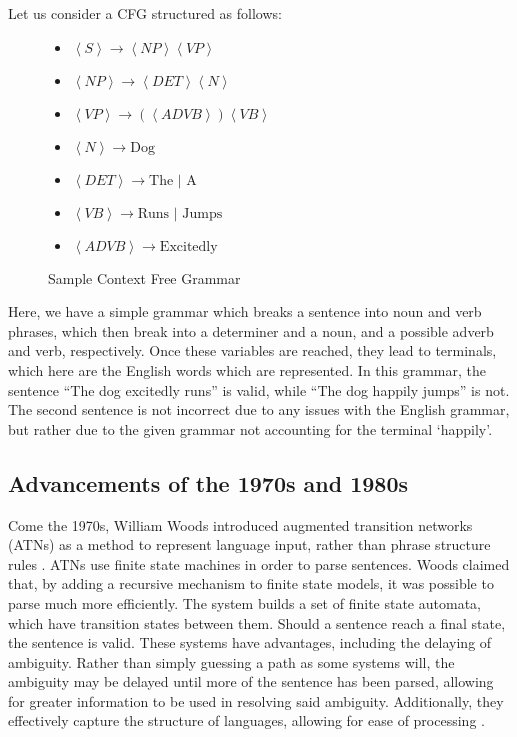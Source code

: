 Let us consider a CFG structured as follows:

\begin{center}
\begin{figure}[H]
\begin{center}

\begin{itemize}

	\item $\left<S\right> \rightarrow \left< NP \right> \left<VP\right>$
	\item $\left<NP\right> \rightarrow \left<DET\right> \left<N\right>$
	\item $\left<VP\right> \rightarrow (\left<ADVB\right>) \left<VB\right>$
	\item $\left<N\right> \rightarrow \text{Dog}$
	\item $\left<DET\right> \rightarrow \text{The | A}$
	\item $\left<VB\right> \rightarrow \text{Runs | Jumps}$
	\item $\left<ADVB\right> \rightarrow \text{Excitedly}$

\end{itemize}
\end{center}
\caption{Sample Context Free Grammar}
\end{figure}
\end{center}


Here, we have a simple grammar which breaks a sentence into noun and verb phrases, which then break into a determiner and a noun, and a possible adverb and verb, respectively. Once these variables are reached, they lead to terminals, which here are the English words which are represented. In this grammar, the sentence ``The dog excitedly runs'' is valid, while ``The dog happily jumps'' is not. The second sentence is not incorrect due to any issues with the English grammar, but rather due to the given grammar not accounting for the terminal `happily'.



\subsection{Advancements of the 1970s and 1980s}

Come the 1970s, William Woods introduced augmented transition networks (ATNs) as a method to represent language input, rather than phrase structure rules \cite{Woods}. ATNs use finite state machines in order to parse sentences. Woods claimed that, by adding a recursive mechanism to finite state models, it was possible to parse much more efficiently. The system builds a set of finite state automata, which have transition states between them. Should a sentence reach a final state, the sentence is valid. These systems have advantages, including the delaying of ambiguity. Rather than simply guessing a path as some systems will, the ambiguity may be delayed until more of the sentence has been parsed, allowing for greater information to be used in resolving said ambiguity. Additionally, they effectively capture the structure of languages, allowing for ease of processing \cite{Woods}.

